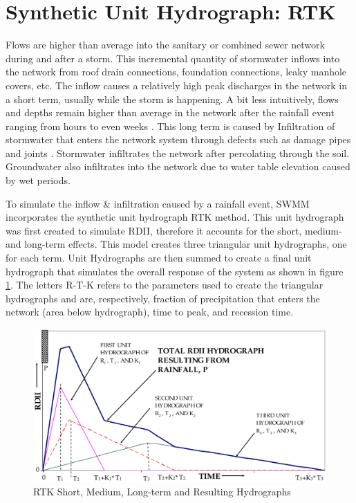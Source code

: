 \section{Synthetic Unit Hydrograph: RTK}

Flows are higher than average into the sanitary or combined sewer network during and after a storm. This incremental quantity of stormwater inflows into the network from roof drain connections, foundation connections, leaky manhole covers, etc. \cite{Rossman2016} The inflow causes a relatively high peak discharges in the network in a short term, usually while the storm is happening. A bit less intuitively, flows and depths remain higher than average in the network after the rainfall event ranging from hours to even weeks \cite{Mosley2001}. This long term is caused by Infiltration of stormwater that enters the network system through defects such as damage pipes and joints \cite{Rossman2016}. Stormwater infiltrates the network after percolating through the soil. Groundwater also infiltrates into the network due to water table elevation caused by wet periods.

To simulate the inflow \& infiltration caused by a rainfall event, SWMM incorporates the synthetic unit hydrograph RTK method. This unit hydrograph was first created to simulate RDII, therefore it accounts for the short, medium- and long-term effects. This model creates three triangular unit hydrographs, one for each term. Unit Hydrographs are then summed to create a final unit hydrograph that simulates the overall response of the system as shown in figure \ref{fig:rtkhydrographs}. The letters R-T-K refers to the parameters used to create the triangular hydrographs and are, respectively, fraction of precipitation that enters the network (area below hydrograph), time to peak, and recession time.

\begin{figure}[h]
    \centering
	\includegraphics[scale=0.45]{figures/rtk_hydrographs.png}
	\caption{RTK Short, Medium, Long-term and Resulting Hydrographs \cite{Vallabhaneni2007}}
	\label{fig:rtkhydrographs}
\end{figure}








